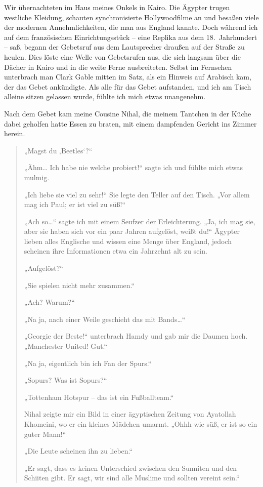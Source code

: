 \documentclass[12pt]{memoir}
\begin{document}
Wir übernachteten im Haus meines Onkels in Kairo.
Die Ägypter trugen westliche Kleidung,
schauten synchronisierte Hollywoodfilme an
und besaßen viele der modernen Annehmlichkeiten, die man aus England kannte.
Doch während ich auf dem französischen Einrichtungsstück –
eine Replika aus dem 18.\ Jahrhundert – saß,
begann der Gebetsruf aus dem Lautsprecher draußen auf der Straße zu heulen.
Dies löste eine Welle von Gebetsrufen aus,
die sich langsam über die Dächer in Kairo und in die weite Ferne ausbreiteten.
Selbst im Fernsehen unterbrach man Clark Gable mitten im Satz,
als ein Hinweis auf Arabisch kam, der das Gebet ankündigte.
Als alle für das Gebet aufstanden,
und ich am Tisch alleine sitzen gelassen wurde,
fühlte ich mich etwas unangenehm.

Nach dem Gebet kam meine Cousine Nihal,
die meinem Tantchen in der Küche dabei geholfen hatte Essen zu braten,
mit einem dampfenden Gericht ins Zimmer herein.

\begin{quote}
„Magst du ‚Beetles‘?“

„Ähm… Ich habe nie welche probiert!“ sagte ich und fühlte mich etwas mulmig.

„Ich liebe sie viel zu sehr!“
Sie legte den Teller auf den Tisch.
„Vor allem mag ich Paul; er ist viel zu süß!“

„Ach so…“ sagte ich mit einem Seufzer der Erleichterung.
„Ja, ich mag sie, aber sie haben sich vor ein paar Jahren aufgelöst, weißt du!“
Ägypter lieben alles Englische und wissen eine Menge über England,
jedoch scheinen ihre Informationen etwa ein Jahrzehnt alt zu sein.

„Aufgelöst?“

„Sie spielen nicht mehr zusammen.“

„Ach? Warum?“

„Na ja, nach einer Weile geschieht das mit Bands…“

„Georgie der Beste!“ unterbrach Hamdy und gab mir die Daumen hoch.
„Manchester United! Gut.“

„Na ja, eigentlich bin ich Fan der Spurs.“

„Sopurs? Was ist Sopurs?“

„Tottenham Hotspur – das ist ein Fußballteam.“

Nihal zeigte mir ein Bild in einer ägyptischen Zeitung von Ayatollah Khomeini,
wo er ein kleines Mädchen umarmt.
„Ohhh wie süß, er ist so ein guter Mann!“

„Die Leute scheinen ihn zu lieben.“

„Er sagt, dass es keinen Unterschied zwischen den Sunniten
und den Schiiten gibt.
Er sagt, wir sind alle Muslime und sollten vereint sein.“
\end{quote}
\end{document}
